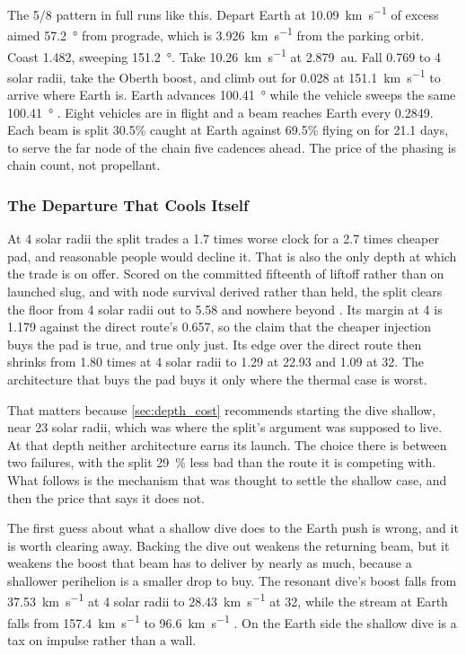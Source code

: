 \documentclass{article}
\begin{document}
The 5/8 pattern in full runs like this. Depart Earth at \SI{10.09}{\kilo\meter\per\second} of excess aimed \SI{57.2}{\degree} from prograde, which is \SI{3.926}{\kilo\meter\per\second} from the parking orbit. Coast \SI{1.482}{\year}, sweeping \SI{151.2}{\degree}. Take \SI{10.26}{\kilo\meter\per\second} at \SI{2.879}{\astronomicalunit}. Fall \SI{0.769}{\year} to 4 solar radii, take the Oberth boost, and climb out for \SI{0.028}{\year} at \SI{151.1}{\kilo\meter\per\second} to arrive where Earth is. Earth advances \SI{100.41}{\degree} while the vehicle sweeps the same \SI{100.41}{\degree} \cite{Katz_aim_is_all_you_need_2025}. Eight vehicles are in flight and a beam reaches Earth every \SI{0.2849}{\year}. Each beam is split 30.5\% caught at Earth against 69.5\% flying on for \num{21.1} days, to serve the far node of the chain five cadences ahead. The price of the phasing is chain count, not propellant.

\subsubsection{The Departure That Cools Itself}\label{sec:self_cooling_departure}
At 4 solar radii the split trades a 1.7 times worse clock for a 2.7 times cheaper pad, and reasonable people would decline it. That is also the only depth at which the trade is on offer. Scored on the committed fifteenth of liftoff rather than on launched slug, and with node survival derived rather than held, the split clears the floor from 4 solar radii out to \num{5.58} and nowhere beyond \cite{Katz_aim_is_all_you_need_2025}. Its margin at 4 is \num{1.179} against the direct route's \num{0.657}, so the claim that the cheaper injection buys the pad is true, and true only just. Its edge over the direct route then shrinks from \num{1.80} times at 4 solar radii to \num{1.29} at \num{22.93} and \num{1.09} at 32. The architecture that buys the pad buys it only where the thermal case is worst.

That matters because \autoref{sec:depth_cost} recommends starting the dive shallow, near 23 solar radii, which was where the split's argument was supposed to live. At that depth neither architecture earns its launch. The choice there is between two failures, with the split \SI{29}{\percent} less bad than the route it is competing with. What follows is the mechanism that was thought to settle the shallow case, and then the price that says it does not.

The first guess about what a shallow dive does to the Earth push is wrong, and it is worth clearing away. Backing the dive out weakens the returning beam, but it weakens the boost that beam has to deliver by nearly as much, because a shallower perihelion is a smaller drop to buy. The resonant dive's boost falls from \SI{37.53}{\kilo\meter\per\second} at 4 solar radii to \SI{28.43}{\kilo\meter\per\second} at 32, while the stream at Earth falls from \SI{157.4}{\kilo\meter\per\second} to \SI{96.6}{\kilo\meter\per\second} \cite{Katz_aim_is_all_you_need_2025}. On the Earth side the shallow dive is a tax on impulse rather than a wall.
\end{document}
